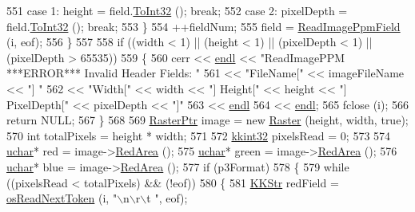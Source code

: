 \begin{DoxyCode}
551     \textcolor{keywordflow}{case}  1: height     = field.\hyperlink{class_k_k_b_1_1_k_k_str_ab3b9de5eb86600593ac866e8323caa32}{ToInt32} ();   \textcolor{keywordflow}{break};
552     \textcolor{keywordflow}{case}  2: pixelDepth = field.\hyperlink{class_k_k_b_1_1_k_k_str_ab3b9de5eb86600593ac866e8323caa32}{ToInt32} ();   \textcolor{keywordflow}{break};
553     \}
554     ++fieldNum;
555     field =  \hyperlink{namespace_k_k_b_ade6c5f0d9736c3f249ae35cd3d067151}{ReadImagePpmField} (i, eof);
556   \}
557 
558   \textcolor{keywordflow}{if}  ((width < 1)  ||  (height < 1)  ||  (pixelDepth < 1)  ||  (pixelDepth > 65535))
559   \{
560     cerr << \hyperlink{namespace_k_k_b_ad1f50f65af6adc8fa9e6f62d007818a8}{endl} << \textcolor{stringliteral}{"ReadImagePPM   ***ERROR***    Invalid Header Fields:  "}
561       << \textcolor{stringliteral}{"FileName["} << imageFileName << \textcolor{stringliteral}{"]  "}
562       << \textcolor{stringliteral}{"Width["}  << width << \textcolor{stringliteral}{"]  Height["} << height << \textcolor{stringliteral}{"]  PixelDepth["} << pixelDepth << \textcolor{stringliteral}{"]"}
563       << \hyperlink{namespace_k_k_b_ad1f50f65af6adc8fa9e6f62d007818a8}{endl}
564       << \hyperlink{namespace_k_k_b_ad1f50f65af6adc8fa9e6f62d007818a8}{endl};
565     fclose (i);
566     \textcolor{keywordflow}{return} NULL;
567   \}
568 
569   \hyperlink{class_k_k_b_1_1_raster}{RasterPtr}  image = \textcolor{keyword}{new} \hyperlink{class_k_k_b_1_1_raster}{Raster} (height, width, \textcolor{keyword}{true});
570   \textcolor{keywordtype}{int}  totalPixels = height * width;
571 
572   \hyperlink{namespace_k_k_b_a8fa4952cc84fda1de4bec1fbdd8d5b1b}{kkint32}  pixelsRead = 0;
573 
574   \hyperlink{namespace_k_k_b_ace9969169bf514f9ee6185186949cdf7}{uchar}*  red   = image->\hyperlink{class_k_k_b_1_1_raster_aa3d0f9b4ce0fdd8ac97f996058d09b22}{RedArea} ();
575   \hyperlink{namespace_k_k_b_ace9969169bf514f9ee6185186949cdf7}{uchar}*  green = image->\hyperlink{class_k_k_b_1_1_raster_aa3d0f9b4ce0fdd8ac97f996058d09b22}{RedArea} ();
576   \hyperlink{namespace_k_k_b_ace9969169bf514f9ee6185186949cdf7}{uchar}*  blue  = image->\hyperlink{class_k_k_b_1_1_raster_aa3d0f9b4ce0fdd8ac97f996058d09b22}{RedArea} ();
577   \textcolor{keywordflow}{if}  (p3Format)
578   \{
579     \textcolor{keywordflow}{while}  ((pixelsRead < totalPixels)  &&  (!eof))
580     \{
581       \hyperlink{class_k_k_b_1_1_k_k_str}{KKStr}  redField   = \hyperlink{namespace_k_k_b_a6012e8136571d88dd794f8b5cf5ff574}{osReadNextToken} (i, \textcolor{stringliteral}{"\(\backslash\)n\(\backslash\)r\(\backslash\)t "}, eof);

\end{DoxyCode}
